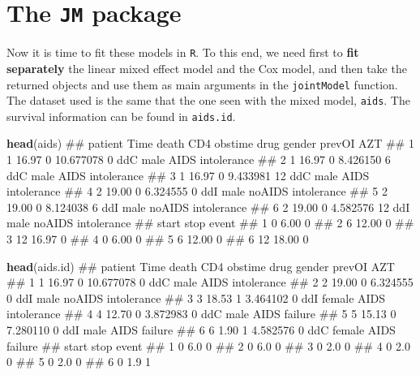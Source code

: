 \documentclass[]{book}
\makeatletter
\newenvironment{Shaded}{\begin{snugshade}}{\end{snugshade}}
\newcommand{\KeywordTok}[1]{\textcolor[rgb]{0.13,0.29,0.53}{\textbf{#1}}}
\newcommand{\NormalTok}[1]{#1}
\newenvironment{kframe}{%
\medskip{}
\setlength{\fboxsep}{.8em}
 \def\at@end@of@kframe{}%
 \ifinner\ifhmode%
  \def\at@end@of@kframe{\end{minipage}}%
  \begin{minipage}{\columnwidth}%
 \fi\fi%
 \def\FrameCommand##1{\hskip\@totalleftmargin \hskip-\fboxsep
 \colorbox{shadecolor}{##1}\hskip-\fboxsep
     \hskip-\linewidth \hskip-\@totalleftmargin \hskip\columnwidth}%
 \MakeFramed {\advance\hsize-\width
   \@totalleftmargin\z@ \linewidth\hsize
   \@setminipage}}%
 {\par\unskip\endMakeFramed%
 \at@end@of@kframe}
\renewenvironment{Shaded}{\begin{kframe}}{\end{kframe}}
\theoremstyle{definition}
\theoremstyle{definition}
\theoremstyle{definition}
\theoremstyle{remark}
\makeatother
\begin{document}
\section{\texorpdfstring{The \texttt{JM}
package}{The JM package}}\label{the-jm-package}

Now it is time to fit these models in \texttt{R}. To this end, we need
first to \textbf{fit separately} the linear mixed effect model and the
Cox model, and then take the returned objects and use them as main
arguments in the \texttt{jointModel} function. The dataset used is the
same that the one seen with the mixed model, \texttt{aids}. The survival
information can be found in \texttt{aids.id}.

\begin{Shaded}
\begin{Highlighting}[]
\KeywordTok{head}\NormalTok{(aids)}
\NormalTok{##   patient  Time death       CD4 obstime drug gender prevOI         AZT}
\NormalTok{## 1       1 16.97     0 10.677078       0  ddC   male   AIDS intolerance}
\NormalTok{## 2       1 16.97     0  8.426150       6  ddC   male   AIDS intolerance}
\NormalTok{## 3       1 16.97     0  9.433981      12  ddC   male   AIDS intolerance}
\NormalTok{## 4       2 19.00     0  6.324555       0  ddI   male noAIDS intolerance}
\NormalTok{## 5       2 19.00     0  8.124038       6  ddI   male noAIDS intolerance}
\NormalTok{## 6       2 19.00     0  4.582576      12  ddI   male noAIDS intolerance}
\NormalTok{##   start  stop event}
\NormalTok{## 1     0  6.00     0}
\NormalTok{## 2     6 12.00     0}
\NormalTok{## 3    12 16.97     0}
\NormalTok{## 4     0  6.00     0}
\NormalTok{## 5     6 12.00     0}
\NormalTok{## 6    12 18.00     0}

\KeywordTok{head}\NormalTok{(aids.id)}
\NormalTok{##   patient  Time death       CD4 obstime drug gender prevOI         AZT}
\NormalTok{## 1       1 16.97     0 10.677078       0  ddC   male   AIDS intolerance}
\NormalTok{## 2       2 19.00     0  6.324555       0  ddI   male noAIDS intolerance}
\NormalTok{## 3       3 18.53     1  3.464102       0  ddI female   AIDS intolerance}
\NormalTok{## 4       4 12.70     0  3.872983       0  ddC   male   AIDS     failure}
\NormalTok{## 5       5 15.13     0  7.280110       0  ddI   male   AIDS     failure}
\NormalTok{## 6       6  1.90     1  4.582576       0  ddC female   AIDS     failure}
\NormalTok{##   start stop event}
\NormalTok{## 1     0  6.0     0}
\NormalTok{## 2     0  6.0     0}
\NormalTok{## 3     0  2.0     0}
\NormalTok{## 4     0  2.0     0}
\NormalTok{## 5     0  2.0     0}
\NormalTok{## 6     0  1.9     1}
\end{Highlighting}
\end{Shaded}
\end{document}

